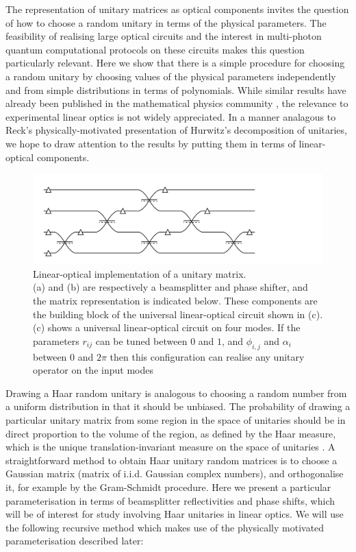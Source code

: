 \documentclass[aps,prl,twocolumn]{revtex4}
\begin{document}
The representation of unitary matrices as optical components invites the
question of how to choose a random unitary in terms of the physical parameters. 
The feasibility of realising large optical circuits and the interest in
multi-photon quantum computational protocols on these circuits makes this
question particularly relevant. Here we show that there is a simple procedure
for choosing a random unitary by choosing values of the physical parameters
independently and from simple distributions in terms of polynomials. While
similar results have already been published in the mathematical physics
community \cite{sp-jmp-53-013501, zy-jpa-27-4235}, the relevance to experimental
linear optics is not widely appreciated. In a manner analagous to Reck's
physically-motivated presentation of Hurwitz's decomposition of unitaries, we
hope to draw attention to the results by putting them in terms of linear-optical
components.

\begin{figure}[h]
  \centering
  \includegraphics{figures/unitary}
  \caption{Linear-optical implementation of a unitary matrix.\\
    (a) and (b) are
    respectively a beamsplitter and phase shifter, and the matrix representation
    is indicated below. These components are the building
    block of the universal linear-optical circuit shown in (c). \\
    (c) shows a universal linear-optical circuit on four modes. If the
    parameters \(r_{ij}\)
    can be tuned between \(0\) and \(1\), and \(\phi_{i,j}\) and \(\alpha_i\)
    between \(0\) and \(2\pi\) then this configuration can realise any unitary
    operator on the input modes}
  \label{fig:unitary}
\end{figure}

Drawing a Haar random unitary is analogous to choosing a random number from a
uniform distribution in that it should be unbiased. The probability of drawing
a particular unitary matrix from some region in the space of unitaries should
be in direct proportion to the volume of the region, as defined by the Haar
measure, which is the unique translation-invariant measure on the space of
unitaries \cite{re-phd}.  A straightforward method to obtain Haar unitary random
matrices is to choose a Gaussian matrix (matrix of i.i.d. Gaussian complex
numbers), and orthogonalise it\cite{re-phd}, for example by the Gram-Schmidt
procedure.  Here
we present a particular parameterisation in terms of beamsplitter reflectivities
and phase shifts, which will be of interest for study involving Haar unitaries
in linear optics. We will use the following recursive method which makes use of
the physically motivated parameterisation described later:
\end{document}
